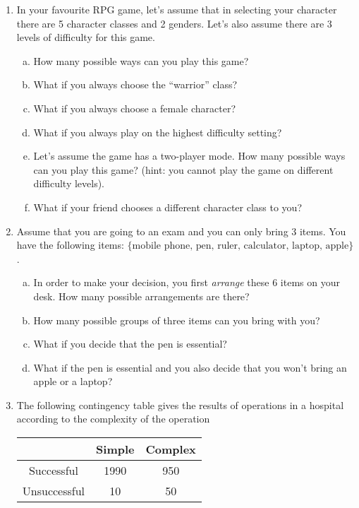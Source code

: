 \documentclass[a4paper,12pt]{article}
\begin{document}
	
	\begin{enumerate}
		
\item 
	In your favourite RPG game, let's assume that in selecting your character there are 5 character classes and 2 genders. Let's also assume there are 3 levels of difficulty for this game.\\[-0.2cm]
	\begin{enumerate}[(a)]
		\item How many possible ways can you play this game? 
		\item What if you always choose the ``warrior'' class? 
		\item What if you always choose a female character? 
		\item What if you always play on the highest difficulty setting? 
		\item  Let's assume the game has a two-player mode. How many possible ways can you play this game? (hint: you cannot play the game on different difficulty levels). \item  What if your friend chooses a different character class to you?
		
	\end{enumerate}
	
	
	
\item 
	Assume that you are going to an exam and you can only bring 3 items. You have the following items: $\{\text{mobile phone, } \text{pen, } \text{ruler, } \text{calculator, } \text{laptop, } \text{apple} \}$.\\
	
	\begin{enumerate}[(a)]
		\item In order to make your decision, you first \emph{arrange} these 6 items on your desk. How many possible arrangements are there? \item How many possible groups of three items can you bring with you? \item What if you decide that the pen is essential? \item What if the pen is essential and you also decide that you won't bring an apple or a laptop?
	\end{enumerate}

\item 	The following contingency table gives the results of operations in a hospital according to the complexity of the operation
\begin{center}
\begin{tabular}{|c|c|c|} \hline
	& Simple	& Complex\\ \hline
	Successful& 	1990&	950 \\ \hline
	Unsuccessful& 	10&	50 \\ \hline
	

\end{tabular}
\end{center}
\end{enumerate}
\end{document}
